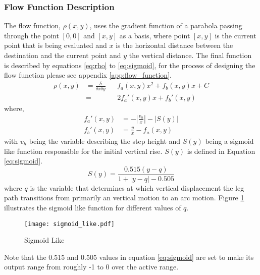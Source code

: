         \subsubsection{Flow Function Description} \label{sec:flow_function}
            The flow function, \(\rho(x,y)\), uses the gradient function of a parabola passing through the point \([0,0]\) and \([x,y]\) as a basis, where point \([x,y]\)
            is the current point that is being evaluated and \(x\) is the horizontal distance between the destination and the current point and \(y\) the
            vertical distance. The final function is described by equations \ref{eq:rho} to \ref{eq:sigmoid}, for the process of designing the flow function
            please see appendix \ref{app:flow_function}.
            \begin{equation} \label{eq:rho}
                \begin{aligned}
                    \rho(x,y) &= \frac{\delta}{\delta x\delta y}&&f_a(x,y)x^2 + f_b(x,y)x + C\\
                    &= &&2f_a'(x,y)x + f_b'(x,y)    
                \end{aligned}
            \end{equation}
            where, %
            \begin{align} \label{eq:fa}
                f_a'(x,y) &= -\left|\frac{v_h}{x}\right| - \left|S(y)\right|\\
                f_b'(x,y) &= \frac{y}{x} - f_a(x,y)
            \end{align}
            with \(v_h\) being the variable describing the step height and \(S(y)\) being a sigmoid like function 
            responsible for the initial vertical rise. \(S(y)\) is defined in Equation \ref{eq:sigmoid}.
            \begin{equation} \label{eq:sigmoid}
                S(y) = \frac{0.515(y-q)}{1+\left|y-q\right|-0.505}
            \end{equation}
            where \(q\) is the variable that determines at which vertical displacement the leg path transitions from primarily an vertical motion to
            an arc motion. Figure \ref{fig:sigmoid_like} illustrates the sigmoid like function for different values of \(q\).
            \begin{figure}[h]
                \centering
                \hspace{-1.38cm}
                \texttt{[image: sigmoid\_like.pdf]}
                \caption{Sigmoid Like}
                \label{fig:sigmoid_like}
            \end{figure}

            \noindent
            Note that the 0.515 and 0.505 values in equation \ref{eq:sigmoid} are set to make its output range from roughly -1 to 0 over the active range.